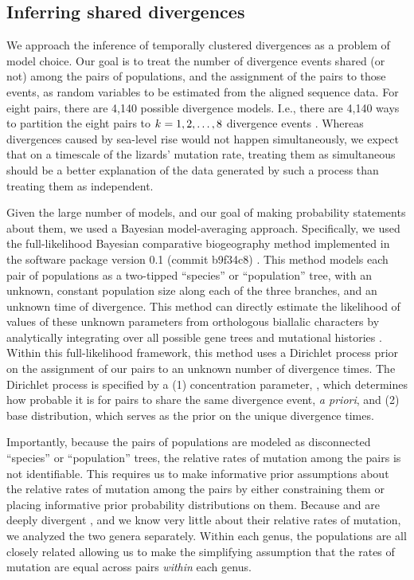 \subsection{Inferring shared divergences}
We approach the inference of temporally clustered divergences as a problem of
model choice.
Our goal is to treat the number of divergence events shared (or not) among the
pairs of populations, and the assignment of the pairs to those events, as
random variables to be estimated from the aligned sequence data.
For eight pairs, there are 4,140 possible divergence models.
I.e., there are 4,140 ways to partition the eight pairs to $k_{} = 1, 2,
\ldots, 8$ divergence events \citep{Bell1934,Oaks2014dpp,Oaks2018ecoevolity}.
Whereas divergences caused by sea-level rise would not happen simultaneously,
we expect that on a timescale of the lizards' mutation rate, treating them as
simultaneous should be a better explanation of the data generated by such a
process than treating them as independent.

Given the large number of models, and our goal of making probability statements
about them, we used a Bayesian model-averaging approach.
Specifically, we used the full-likelihood Bayesian comparative biogeography
method implemented in the software package \ecoevolity version 0.1 (commit
b9f34c8) \citep{Oaks2018ecoevolity}.
This method models each pair of populations as a two-tipped ``species'' or
``population'' tree, with an unknown, constant population size along each of
the three branches, and an unknown time of divergence.
This method can directly estimate the likelihood of values of these unknown
parameters from orthologous biallalic characters by analytically integrating
over all possible gene trees and mutational histories \citep{Bryant2012,
    Oaks2018ecoevolity}.
Within this full-likelihood framework, this method uses a Dirichlet process
prior on the assignment of our pairs to an unknown number of divergence times.
The Dirichlet process is specified by a
(1) concentration parameter, \concentration, which determines how probable it
is for pairs to share the same divergence event, \emph{a priori}, and
(2) base distribution, which serves as the prior on the unique divergence
times.

Importantly, because the pairs of populations are modeled as disconnected
``species'' or ``population'' trees, the relative rates of mutation among the
pairs is not identifiable.
This requires us to make informative prior assumptions about the relative rates
of mutation among the pairs by either constraining them or placing informative
prior probability distributions on them.
Because  and  are deeply divergent
\citationNeeded, and we know very little about their relative rates of
mutation, we analyzed the two genera separately.
Within each genus, the populations are all closely related \citep{Welton2010,
    Welton2010zootaxa, Siler2010, Siler2012, Siler2014kikuchii} allowing us to
make the simplifying assumption that the rates of mutation are equal across
pairs \emph{within} each genus.

